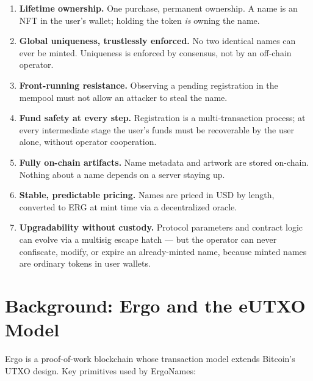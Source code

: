 \documentclass[11pt]{article}
\begin{document}
\begin{enumerate}
  \item \textbf{Lifetime ownership.} One purchase, permanent ownership. A name
        is an NFT in the user's wallet; holding the token \emph{is} owning the
        name.
  \item \textbf{Global uniqueness, trustlessly enforced.} No two identical
        names can ever be minted. Uniqueness is enforced by consensus, not by
        an off-chain operator.
  \item \textbf{Front-running resistance.} Observing a pending registration in
        the mempool must not allow an attacker to steal the name.
  \item \textbf{Fund safety at every step.} Registration is a
        multi-transaction process; at every intermediate stage the user's
        funds must be recoverable by the user alone, without operator
        cooperation.
  \item \textbf{Fully on-chain artifacts.} Name metadata and artwork are
        stored on-chain. Nothing about a name depends on a server staying up.
  \item \textbf{Stable, predictable pricing.} Names are priced in USD by
        length, converted to ERG at mint time via a decentralized oracle.
  \item \textbf{Upgradability without custody.} Protocol parameters and
        contract logic can evolve via a multisig escape hatch --- but the
        operator can never confiscate, modify, or expire an already-minted
        name, because minted names are ordinary tokens in user wallets.
\end{enumerate}

\section{Background: Ergo and the eUTXO Model}

Ergo is a proof-of-work blockchain whose transaction model extends Bitcoin's
UTXO design. Key primitives used by ErgoNames:
\end{document}
